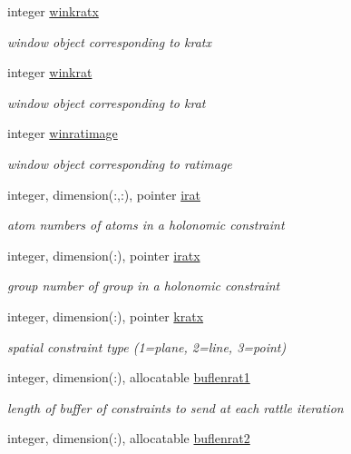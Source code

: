 \begin{DoxyCompactItemize}
integer \hyperlink{classfreeze_a6d6f5dce334fa4a1acea8252e22392d1}{winkratx}
\begin{DoxyCompactList}\small\item\em window object corresponding to kratx \end{DoxyCompactList}\item 
integer \hyperlink{classfreeze_ae8561a49dbd4f2ca81de976fe32e20d0}{winkrat}
\begin{DoxyCompactList}\small\item\em window object corresponding to krat \end{DoxyCompactList}\item 
integer \hyperlink{classfreeze_aa821a95ce853304c4fa818234dc51d22}{winratimage}
\begin{DoxyCompactList}\small\item\em window object corresponding to ratimage \end{DoxyCompactList}\item 
integer, dimension(\-:,\-:), pointer \hyperlink{classfreeze_a9443d6b563ebf61724437362386a6a16}{irat}
\begin{DoxyCompactList}\small\item\em atom numbers of atoms in a holonomic constraint \end{DoxyCompactList}\item 
integer, dimension(\-:), pointer \hyperlink{classfreeze_af92fddc0d1311be14c0235f71949701c}{iratx}
\begin{DoxyCompactList}\small\item\em group number of group in a holonomic constraint \end{DoxyCompactList}\item 
integer, dimension(\-:), pointer \hyperlink{classfreeze_a9e149f0f2792e501695dc2e1e1680eaf}{kratx}
\begin{DoxyCompactList}\small\item\em spatial constraint type (1=plane, 2=line, 3=point) \end{DoxyCompactList}\item 
integer, dimension(\-:), allocatable \hyperlink{classfreeze_a03593d28905d3b9be544fe1ff812476c}{buflenrat1}
\begin{DoxyCompactList}\small\item\em length of buffer of constraints to send at each rattle iteration \end{DoxyCompactList}\item 
integer, dimension(\-:), allocatable \hyperlink{classfreeze_a499d4830e088de939ad8fdb230bfe30c}{buflenrat2}

\end{DoxyCompactItemize}
